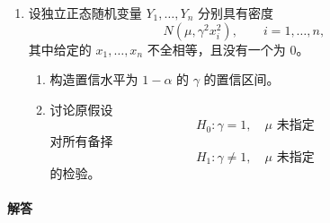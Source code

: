 \documentclass[UTF8,12pt]{ctexart}
\begin{document}
\begin{enumerate}[label=\textbf{\arabic*.},leftmargin=2.2em]
\item 设独立正态随机变量 \(Y_1,\ldots,Y_n\) 分别具有密度
\[
N(\mu,\gamma^2x_i^2),\qquad i=1,\ldots,n,
\]
其中给定的 \(x_1,\ldots,x_n\) 不全相等，且没有一个为 \(0\)。
\begin{enumerate}[label=\textbf{(\alph*)},leftmargin=2.4em]
\item 构造置信水平为 \(1-\alpha\) 的 \(\gamma\) 的置信区间。
\item 讨论原假设
\[
H_0:\gamma=1,\quad \mu\text{ 未指定}
\]
对所有备择
\[
H_1:\gamma\ne1,\quad \mu\text{ 未指定}
\]
的检验。
\end{enumerate}
\end{enumerate}

\paragraph{解答}
\end{document}
